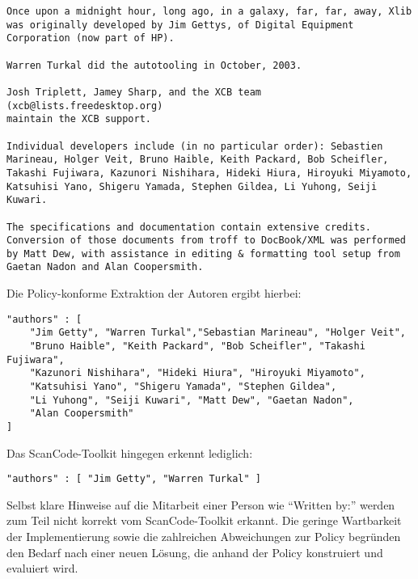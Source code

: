 \begin{lstlisting}[keepspaces=true]
Once upon a midnight hour, long ago, in a galaxy, far, far, away, Xlib
was originally developed by Jim Gettys, of Digital Equipment
Corporation (now part of HP).

Warren Turkal did the autotooling in October, 2003.

Josh Triplett, Jamey Sharp, and the XCB team (xcb@lists.freedesktop.org)
maintain the XCB support.

Individual developers include (in no particular order): Sebastien
Marineau, Holger Veit, Bruno Haible, Keith Packard, Bob Scheifler,
Takashi Fujiwara, Kazunori Nishihara, Hideki Hiura, Hiroyuki Miyamoto,
Katsuhisi Yano, Shigeru Yamada, Stephen Gildea, Li Yuhong, Seiji Kuwari.

The specifications and documentation contain extensive credits.
Conversion of those documents from troff to DocBook/XML was performed
by Matt Dew, with assistance in editing & formatting tool setup from
Gaetan Nadon and Alan Coopersmith.
\end{lstlisting}

Die Policy-konforme Extraktion der Autoren ergibt hierbei:

\begin{lstlisting}[keepspaces=true]
"authors" : [
    "Jim Getty", "Warren Turkal","Sebastian Marineau", "Holger Veit",
    "Bruno Haible", "Keith Packard", "Bob Scheifler", "Takashi Fujiwara",
    "Kazunori Nishihara", "Hideki Hiura", "Hiroyuki Miyamoto",
    "Katsuhisi Yano", "Shigeru Yamada", "Stephen Gildea",
    "Li Yuhong", "Seiji Kuwari", "Matt Dew", "Gaetan Nadon",
    "Alan Coopersmith"
]
\end{lstlisting}

Das ScanCode-Toolkit hingegen erkennt lediglich:

\begin{lstlisting}[keepspaces=true]
"authors" : [ "Jim Getty", "Warren Turkal" ]
\end{lstlisting}

Selbst klare Hinweise auf die Mitarbeit einer Person wie \enquote{Written by:} werden zum Teil nicht korrekt vom ScanCode-Toolkit erkannt.
Die geringe Wartbarkeit der Implementierung sowie die zahlreichen Abweichungen zur Policy begründen den Bedarf nach einer neuen Lösung, die anhand der Policy konstruiert und evaluiert wird.


